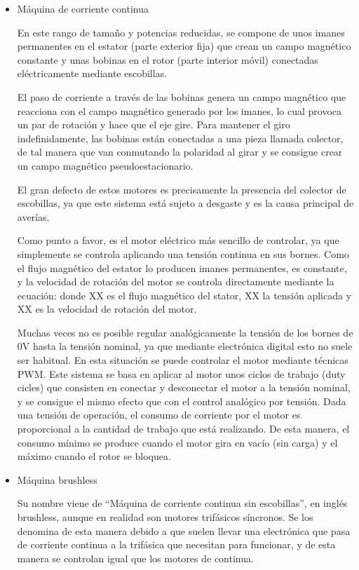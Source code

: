 \documentclass[12pt,twoside]{article}
\begin{document}
		\begin{itemize}
			\item Máquina de corriente continua
			
			En este rango de tamaño y potencias reducidas, se compone de unos imanes permanentes en el estator (parte exterior fija) que crean un campo magnético constante y unas bobinas en el rotor (parte interior móvil) conectadas eléctricamente mediante escobillas.
			
El paso de corriente a través de las bobinas genera un 	campo magnético que 	reacciona con el campo magnético generado por los imanes, lo cual provoca un par de 	rotación y hace que el eje gire. Para mantener el giro indefinidamente, las bobinas 	están conectadas a una pieza llamada colector, de tal manera que van conmutando la 	polaridad al girar y se consigue crear un campo magnético pseudoestacionario.

El gran defecto de estos motores es precisamente la presencia del colector de 	escobillas, ya que este sistema está sujeto a desgaste y es la causa principal de averías.

Como punto a favor, es el motor eléctrico más sencillo de controlar, ya que 	simplemente se controla aplicando una tensión continua en sus bornes. Como el flujo 	magnético del estator lo producen imanes permanentes, es constante, y la 	velocidad de rotación del motor se controla directamente mediante la ecuación:
donde XX es el flujo magnético del stator, XX la tensión aplicada y XX es la velocidad de rotación del motor.

	Muchas veces no es posible regular analógicamente la tensión de los bornes de 0V 	hasta la tensión nominal, ya que mediante electrónica digital esto no suele ser 	habitual. En esta situación se puede controlar el motor mediante técnicas PWM. Este 	sistema se basa en aplicar al motor unos ciclos de trabajo (duty cicles) que consisten en 	conectar y desconectar el motor a la tensión nominal, y se consigue el 	mismo 	efecto 	que con el control analógico por tensión.
	Dada una tensión de operación, el consumo de corriente por el motor es proporcional 	a la cantidad de trabajo que está realizando. De esta manera, el consumo mínimo se 	produce cuando el motor gira en vacío (sin carga) y el máximo cuando el rotor se 	bloquea.

			\item Máquina brushless
			
			Su nombre viene de “Máquina de corriente continua sin escobillas”, en inglés 	brushless, aunque en realidad son motores trifásicos síncronos. Se los denomina de 	esta manera debido a que suelen llevar una electrónica que pasa de corriente continua 	a la trifásica que necesitan para funcionar, y de esta manera se controlan igual que los 	motores de continua.
			

\end{itemize}
\end{document}
